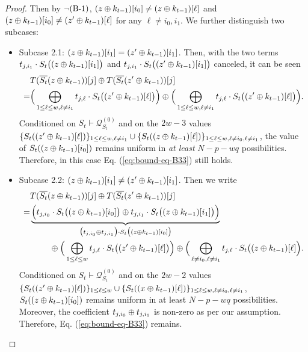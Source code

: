 \begin{proof}
	Then by $\neg\text{(B-1)}$, $(z\oplus k_{t-1})[i_0]\neq(z\oplus k_{t-1})[\ell]$ and $(z\oplus k_{t-1})[i_0]\neq(z'\oplus k_{t-1})[\ell]$ for any $\ell\neq i_0,i_1$. We further distinguish two subcases:
	\begin{itemize}
		\item Subcase 2.1: $(z\oplus k_{t-1})[i_1]=(z'\oplus k_{t-1})[i_1]$. Then, with the two terms $t_{j,i_1}\cdot S_t\big((z\oplus k_{t-1})[i_1]\big)$ and $t_{j,i_1}\cdot S_t\big((z'\oplus k_{t-1})[i_1]\big)$ canceled, it can be seen
		\begin{align*}
		&  T(\overline{S_t}(z\oplus k_{t-1}))[j]\oplus T(\overline{S_t}(z'\oplus k_{t-1}))[j]       \\
		= &
		\Big(\bigoplus_{1\leq\ell\leq w,\ell\neq i_1}t_{j,\ell}\cdot S_t\big((z'\oplus k_{t-1})[\ell]\big)\Big)\oplus
		\Big(\bigoplus_{1\leq\ell\leq w,\ell\neq i_1}t_{j,\ell}\cdot S_t\big((z'\oplus k_{t-1})[\ell]\big)\Big)   .
		\end{align*}
		Conditioned on $S_t\vdash\mathcal{Q}_{S_t}^{(0)}$ and on the $2w-3$ values $\{S_t((z'\oplus k_{t-1})[\ell])\}_{1\leq \ell\leq w,\ell\neq i_1}\cup\{S_t((z\oplus k_{t-1})[\ell])\}_{1\leq \ell\leq w,\ell\neq i_0,\ell\neq i_1}$, the value of $S_t((z\oplus k_{t-1})[i_0])$ remains uniform in {\it at least} $N-p-wq$ possibilities. Therefore, in this case Eq. (\ref{eq:bound-eq-B33}) still holds.
		\item Subcase 2.2: $(z\oplus k_{t-1})[i_1]\neq(z'\oplus k_{t-1})[i_1]$. Then we write
		\begin{align*}
		&  T(\overline{S_t}(z\oplus k_{t-1}))[j]\oplus T(\overline{S_t}(z'\oplus k_{t-1}))[j]       \\
		= &   \underbrace{\Big(t_{j,i_0}\cdot S_t\big((z\oplus k_{t-1})[i_0]\big)
			\oplus
			t_{j,i_1}\cdot S_t\big((z\oplus k_{t-1})[i_1]\big)\Big)}_{\big(t_{j,i_0}\oplus t_{j,i_1}\big)\cdot S_t\big((z\oplus k_{t-1})[i_0]\big)}   	\\
		&\ \ \ \ \ \ \ \oplus
		\Big(\bigoplus_{1\leq\ell\leq w}t_{j,\ell}\cdot S_t\big((z'\oplus k_{t-1})[\ell]\big)\Big)    \oplus
		\Big(\bigoplus_{\ell\neq i_0,\ell\neq i_1}t_{j,\ell}\cdot S_t\big((z\oplus k_{t-1})[\ell]\Big).
		\end{align*}
		Conditioned on $S_t\vdash\mathcal{Q}_{S_t}^{(0)}$ and on the $2w-2$ values $\{S_t((z'\oplus k_{t-1})[\ell])\}_{1\leq \ell\leq w}\cup\{S_t((x\oplus k_{t-1})[\ell])\}_{1\leq \ell\leq w,\ell\neq i_0,\ell\neq i_1}$, $S_t((z\oplus k_{t-1})[i_0])$ remains uniform in at least $N-p-wq$ possibilities. Moreover, the coefficient $t_{j,i_0}\oplus t_{j,i_1}$ is non-zero as per our assumption. Therefore, Eq. (\ref{eq:bound-eq-B33}) remains.
	\end{itemize}
	

\end{proof}
